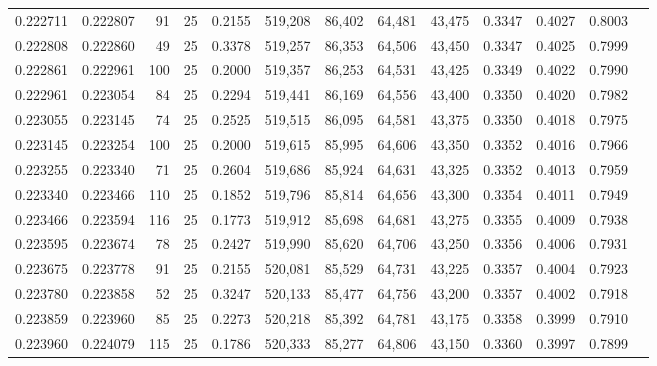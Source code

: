\begin{tabular}{rrrrrrrrrrrrr}
0.222711 & 0.222807 &    91 &  25 &                                     0.2155 & 519,208 &  86,402 &  64,481 &  43,475 & 0.3347 & 0.4027 & 0.8003 \\
0.222808 & 0.222860 &    49 &  25 &                                     0.3378 & 519,257 &  86,353 &  64,506 &  43,450 & 0.3347 & 0.4025 & 0.7999 \\
0.222861 & 0.222961 &   100 &  25 &                                     0.2000 & 519,357 &  86,253 &  64,531 &  43,425 & 0.3349 & 0.4022 & 0.7990 \\
0.222961 & 0.223054 &    84 &  25 &                                     0.2294 & 519,441 &  86,169 &  64,556 &  43,400 & 0.3350 & 0.4020 & 0.7982 \\
0.223055 & 0.223145 &    74 &  25 &                                     0.2525 & 519,515 &  86,095 &  64,581 &  43,375 & 0.3350 & 0.4018 & 0.7975 \\
0.223145 & 0.223254 &   100 &  25 &                                     0.2000 & 519,615 &  85,995 &  64,606 &  43,350 & 0.3352 & 0.4016 & 0.7966 \\
0.223255 & 0.223340 &    71 &  25 &                                     0.2604 & 519,686 &  85,924 &  64,631 &  43,325 & 0.3352 & 0.4013 & 0.7959 \\
0.223340 & 0.223466 &   110 &  25 &                                     0.1852 & 519,796 &  85,814 &  64,656 &  43,300 & 0.3354 & 0.4011 & 0.7949 \\
0.223466 & 0.223594 &   116 &  25 &                                     0.1773 & 519,912 &  85,698 &  64,681 &  43,275 & 0.3355 & 0.4009 & 0.7938 \\
0.223595 & 0.223674 &    78 &  25 &                                     0.2427 & 519,990 &  85,620 &  64,706 &  43,250 & 0.3356 & 0.4006 & 0.7931 \\
0.223675 & 0.223778 &    91 &  25 &                                     0.2155 & 520,081 &  85,529 &  64,731 &  43,225 & 0.3357 & 0.4004 & 0.7923 \\
0.223780 & 0.223858 &    52 &  25 &                                     0.3247 & 520,133 &  85,477 &  64,756 &  43,200 & 0.3357 & 0.4002 & 0.7918 \\
0.223859 & 0.223960 &    85 &  25 &                                     0.2273 & 520,218 &  85,392 &  64,781 &  43,175 & 0.3358 & 0.3999 & 0.7910 \\
0.223960 & 0.224079 &   115 &  25 &                                     0.1786 & 520,333 &  85,277 &  64,806 &  43,150 & 0.3360 & 0.3997 & 0.7899 \\

\end{tabular}
